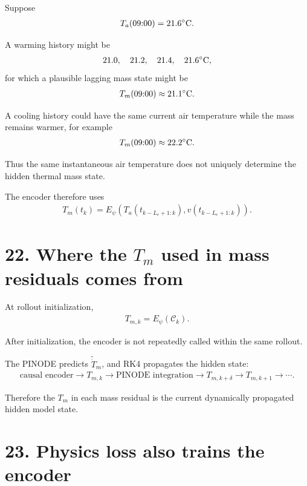 \documentclass[11pt]{article}
\begin{document}
Suppose
\begin{align}
T_a(09{:}00)=21.6^\circ{\rm C}.
\end{align}

A warming history might be
\begin{align}
21.0,\quad21.2,\quad21.4,\quad21.6^\circ{\rm C},
\end{align}
for which a plausible lagging mass state might be
\begin{align}
T_m(09{:}00)\approx21.1^\circ{\rm C}.
\end{align}

A cooling history could have the same current air temperature while the mass remains warmer, for example
\begin{align}
T_m(09{:}00)\approx22.2^\circ{\rm C}.
\end{align}

Thus the same instantaneous air temperature does not uniquely determine the hidden thermal mass state.

The encoder therefore uses
\begin{align}
\boxed{
T_m(t_k)
=
E_\psi
\left(
T_a(t_{k-L_e+1:k}),
v(t_{k-L_e+1:k})
\right).
}
\tag{P4.94}
\end{align}

\section*{22. Where the \(T_m\) used in mass residuals comes from}

At rollout initialization,
\begin{align}
\boxed{T_{m,k}=E_\psi(\mathcal C_k).}
\tag{P4.95}
\end{align}

After initialization, the encoder is not repeatedly called within the same rollout.

The PINODE predicts \(\widetilde{\dot T}_m\), and RK4 propagates the hidden state:
\begin{align}
\boxed{
\text{causal encoder}
\rightarrow
T_{m,k}
\rightarrow
\text{PINODE integration}
\rightarrow
T_{m,k+\delta}
\rightarrow
T_{m,k+1}
\rightarrow\cdots.
}
\tag{P4.96}
\end{align}

Therefore the \(T_m\) in each mass residual is the current dynamically propagated hidden model state.

\section*{23. Physics loss also trains the encoder}
\end{document}
